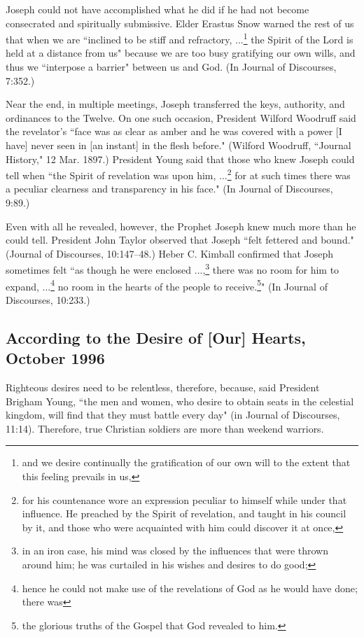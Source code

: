 Joseph could not have accomplished what he did if he had not become consecrated and spiritually submissive. Elder Erastus Snow warned the rest of us that when we are ``inclined to be stiff and refractory, ...\footnote{and we desire continually the gratification of our own will to the extent that this feeling prevails in us,} the Spirit of the Lord is held at a distance from us" because we are too busy gratifying our own wills, and thus we ``interpose a barrier" between us and God. (In Journal of Discourses, 7:352.)

Near the end, in multiple meetings, Joseph transferred the keys, authority, and ordinances to the Twelve. On one such occasion, President Wilford Woodruff said the revelator's ``face was as clear as amber and he was covered with a power [I have] never seen in [an instant] in the flesh before." (Wilford Woodruff, ``Journal History," 12 Mar. 1897.) President Young said that those who knew Joseph could tell when ``the Spirit of revelation was upon him, ...\footnote{for his countenance wore an expression peculiar to himself while under that influence. He preached by the Spirit of revelation, and taught in his council by it, and those who were acquainted with him could discover it at once,} for at such times there was a peculiar clearness and transparency in his face." (In Journal of Discourses, 9:89.)

Even with all he revealed, however, the Prophet Joseph knew much more than he could tell. President John Taylor observed that Joseph ``felt fettered and bound." (Journal of Discourses, 10:147–48.) Heber C. Kimball confirmed that Joseph sometimes felt ``as though he were enclosed ...,\footnote{in an iron case, his mind was closed by the influences that were thrown around him; he was curtailed in his wishes and desires to do good;} there was no room for him to expand, ...\footnote{hence he could not make use of the revelations of God as he would have done; there was} no room in the hearts of the people to receive.\footnote{the glorious truths
of the Gospel that God revealed to him.}" (In Journal of Discourses, 10:233.)

\subsection{According to the Desire of [Our] Hearts, October 1996}

Righteous desires need to be relentless, therefore, because, said President Brigham Young, ``the men and women, who desire to obtain seats in the celestial kingdom, will find that they must battle every day" (in Journal of Discourses, 11:14). Therefore, true Christian soldiers are more than weekend warriors.

